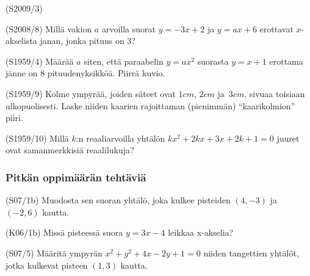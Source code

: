 \begin{tehtava}  (S2009/3)
\end{tehtava}


\begin{tehtava}  (S2008/8)
Millä vakion $a$ arvoilla suorat $y=-3x+2$ ja $y=ax+6$ erottavat $x$-akselista janan, jonka pituus on 3?
\end{tehtava}


\begin{tehtava}  (S1959/4)
Määrää $a$ siten, että paraabelin $y=ax^2$ suorasta $y=x+1$ erottama jänne on 8 pituudenyksikköä. Piirrä kuvio.
\end{tehtava}

\begin{tehtava}(S1959/9)
Kolme ympyrää, joiden säteet ovat $1cm$, $2cm$ ja $3cm$, sivuaa toisiaan ulkopuolisesti. Laske niiden kaarien rajoittaman (pienimmän) ``kaarikolmion'' piiri. 
\end{tehtava}

\begin{tehtava}(S1959/10)
Millä $k$:n reaaliarvoilla yhtälön $kx^2+2kx+3x+2k+1=0$ juuret ovat samanmerkkisiä reaalilukuja? 
\end{tehtava}

\subsubsection*{Pitkän oppimäärän tehtäviä}

\begin{tehtava}(S07/1b)
	Muodosta sen suoran yhtälö, joka kulkee pisteiden $(4, -3)$ ja $(-2,6)$ kautta. 
\end{tehtava}

\begin{tehtava}(K06/1b)
	Missä pisteessä suora $y=3x-4$ leikkaa x-akselia? 
\end{tehtava}

\begin{tehtava} (S07/5)
	Määritä ympyrän $x^2+y^2+4x-2y+1=0$ niiden tangettien yhtälöt, jotka kulkevat pisteen $(1,3)$ kautta.
\end{tehtava}



